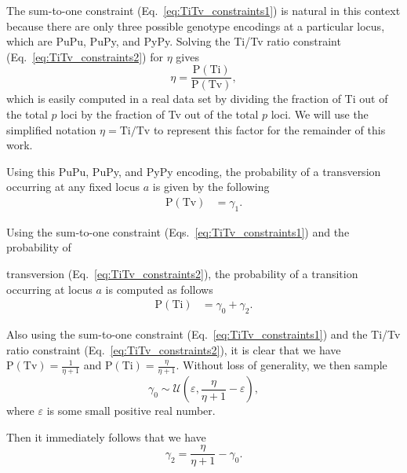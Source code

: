 \documentclass[aos]{imsart}
\begin{document}
The sum-to-one constraint (Eq.~\ref{eq:TiTv_constraints1}) is natural in this context because there are only three possible genotype encodings at a particular locus, which are PuPu, PuPy, and PyPy. Solving the Ti/Tv ratio constraint (Eq.~\ref{eq:TiTv_constraints2}) for $\eta$ gives
%
\[
\eta = \frac{\text{P}(\text{Ti})}{\text{P}(\text{Tv})},
\]
%
which is easily computed in a real data set by dividing the fraction of Ti out of the total $p$ loci by the fraction of Tv out of the total $p$ loci. We will use the simplified notation $\eta=\text{Ti}/\text{Tv}$ to represent this factor for the remainder of this work.

Using this PuPu, PuPy, and PyPy encoding, the probability of a transversion occurring at any fixed locus $a$ is given by the following
%
\begin{equation}\label{eq:prob_Tv}
\begin{aligned}
\text{P}(\text{Tv}) &= \gamma_1.
\end{aligned}
\end{equation}

Using the sum-to-one constraint (Eqs.~\ref{eq:TiTv_constraints1}) and the probability of

\noindent transversion (Eq.~\ref{eq:TiTv_constraints2}), the probability of a transition occurring at locus $a$ is computed as follows
%
\begin{equation}\label{eq:prob_Ti}
\begin{aligned}
\text{P}(\text{Ti}) &= \gamma_0 + \gamma_2.
\end{aligned}
\end{equation}

Also using the sum-to-one constraint (Eq.~\ref{eq:TiTv_constraints1}) and the Ti/Tv ratio constraint (Eq.~\ref{eq:TiTv_constraints2}), it is clear that we have $\text{P}(\text{Tv}) = \frac{1}{\eta + 1}$ and $\text{P}(\text{Ti}) = \frac{\eta}{\eta + 1}$. Without loss of generality, we then sample 
%
\begin{equation}\label{eq:gamma0}
\gamma_0 \sim \mathcal{U}\left(\varepsilon,\frac{\eta}{\eta + 1} - \varepsilon\right),
\end{equation}
%
where $\varepsilon$ is some small positive real number.

Then it immediately follows that we have 
%
\begin{equation}\label{eq:gamma2}
\gamma_2 = \frac{\eta}{\eta + 1} - \gamma_0.
\end{equation}
\end{document}
